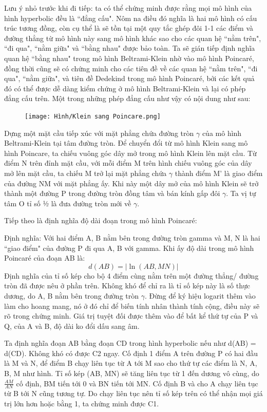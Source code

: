 \begin{multicols}{2}
	\newpage
	
	Lưu ý nhỏ trước khi đi tiếp: ta có thể chứng minh được rằng mọi mô hình của hình hyperbolic đều là ``đẳng cấu". Nôm na điều đó nghĩa là hai mô hình có cấu trúc tương đồng, còn cụ thể là sẽ tồn tại một quy tắc ghép đôi 1-1 các điểm và đường thẳng từ mô hình này sang mô hình khác sao cho các quan hệ ``nằm trên", ``đi qua", ``nằm giữa" và ``bằng nhau" được bảo toàn. Ta sẽ gián tiếp định nghĩa quan hệ ``bằng nhau" trong mô hình Beltrami-Klein nhờ vào mô hình Poincaré, đồng thời cũng sẽ có chứng minh cho các tiên đề về các quan hệ ``nằm trên", ``đi qua", ``nằm giữa", và tiên đề Dedekind trong mô hình Poincaré, bởi các kết quả đó có thể được dễ dàng kiểm chứng ở mô hình Beltrami-Klein và lại có phép đẳng cấu trên. Một trong những phép đẳng cấu như vậy có nội dung như sau:
	
	\begin{figure}[ht]
		\texttt{[image: Hình/Klein sang Poincare.png]}
	\end{figure}
	
	Dựng một mặt cầu tiếp xúc với mặt phẳng chứa đường tròn $\gamma$ của mô hình Beltrami-Klein tại tâm đường tròn. Để chuyển đổi từ mô hình Klein sang mô hình Poincare, ta chiếu vuông góc dây mở trong mô hình Klein lên mặt cầu. Từ điểm N trên đỉnh mặt cầu, với mỗi điểm M trên hình chiếu vuông góc của dây mở lên mặt cầu, ta chiếu M trở lại mặt phẳng chứa $\gamma$ thành điểm M' là giao điểm của đường NM với mặt phẳng ấy. Khi này một dây mở của mô hình Klein sẽ trở thành một đường P trong đường tròn đồng tâm và bán kính gấp đôi $\gamma$. Ta vị tự tâm O tỉ số ½ là đưa đường tròn mới về $\gamma$.
	
	Tiếp theo là định nghĩa độ dài đoạn trong mô hình Poincaré:
	
	Định nghĩa: Với hai điểm A, B nằm bên trong đường tròn gamma và M, N là hai ``giao điểm" của đường P đi qua A, B với gamma. Khi ấy độ dài trong mô hình Poincaré của đoạn AB là:
	\[ d(AB) = |\ln{(AB, MN)}| \]
	Định nghĩa của tỉ số kép cho bộ 4 điểm cùng nằm trên một đường thẳng/ đường tròn đã được nêu ở phần trên. Không khó để chỉ ra là tỉ số kép này là số thực dương, do A, B nằm bên trong đường tròn $\gamma$. Đừng để ký hiệu logarit thêm vào làm cho hoang mang, nó ở đó chỉ để biến tính nhân thành tính cộng, điều này sẽ rõ trong chứng minh. Giá trị tuyệt đối được thêm vào để bất kể thứ tự của P và Q, của A và B, độ dài ko đổi dấu sang âm.
	
	Ta định nghĩa đoạn AB bằng đoạn CD trong hình hyperbolic nếu như d(AB) = d(CD). Không khó có được C2 ngay. 
	Cố định 1 điểm A trên đường P có hai đầu là M và N, để điểm B chạy liên tục từ A tới M sao cho thứ tự các điểm là N, A, B, M như hình. Tỉ số kép (AB, MN) sẽ tăng liên tục từ 1 đến dương vô cùng, do $\frac{AM}{AN}$ cố định, BM tiến tới 0 và BN tiến tới MN. Cố định B và cho A chạy liên tục từ B tới N cũng tương tự. Do chạy liên tục nên tỉ số kép trên có thể nhận mọi giá trị lớn hơn hoặc bằng 1, ta chứng minh được C1. 
	

\end{multicols}
